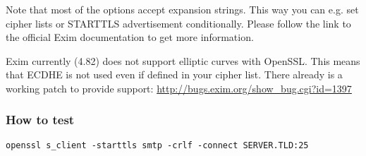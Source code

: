 Note that most of the options accept expansion strings. This way you can e.g. set cipher lists or STARTTLS advertisement conditionally. Please follow the link to the official Exim documentation to get more information.

Exim currently (4.82) does not support elliptic curves with OpenSSL. This means that ECDHE is not used even if defined in your cipher list.
There already is a working patch to provide support:
\url{http://bugs.exim.org/show_bug.cgi?id=1397}

\subsubsection{How to test}
\begin{lstlisting}
openssl s_client -starttls smtp -crlf -connect SERVER.TLD:25
\end{lstlisting}




